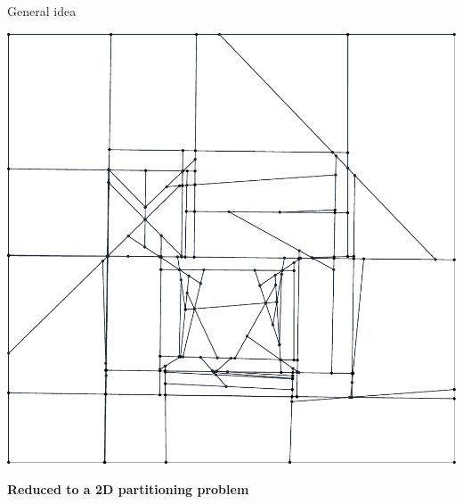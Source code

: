 \begin{frame}{General idea}
	\begin{center}
		\begin{minipage}{0.2\linewidth}
			\includegraphics[height=0.2\textheight]{pipeline/original}
		\end{minipage}%
		\hspace{0.2cm}
		\begin{minipage}{0.7\linewidth}
			\textbf{Reduced to a 2D partitioning problem}
			
			\cite{zhou_5DDualContouring_2010, bauchet_CityReconstructionAirborne_2019}
		\end{minipage}%
	\end{center}

\end{frame}

